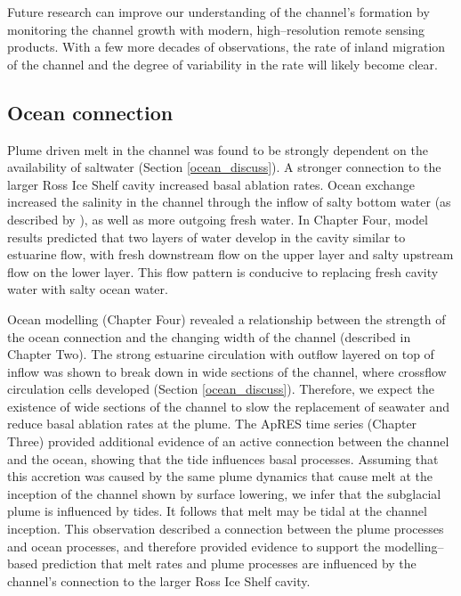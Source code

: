 Future research can improve our understanding of the channel's formation by monitoring the channel growth with modern, high--resolution remote sensing products. With a few more decades of observations, the rate of inland migration of the channel and the degree of variability in the rate will likely become clear.

\subsection{Ocean connection}

Plume driven melt in the channel was found to be strongly dependent on the availability of saltwater (Section \ref{ocean_discuss}).   A stronger connection to the larger Ross Ice Shelf cavity increased basal ablation rates.  Ocean exchange increased the salinity in the channel through the  inflow of salty bottom water (as described by \cite{goldberg2019accurately}), as well as more outgoing fresh water. In Chapter Four, model results predicted that two layers of water develop in the cavity similar to estuarine flow, with fresh downstream flow on the upper layer and salty upstream flow on the lower layer. This flow pattern is conducive to replacing fresh cavity water with salty ocean water. 

Ocean modelling (Chapter Four) revealed a relationship between the strength of the ocean connection and the changing width of the channel (described in Chapter Two). The strong estuarine circulation with outflow layered on top of inflow was shown to break down in wide sections of the channel, where crossflow circulation cells developed (Section \ref{ocean_discuss}). Therefore, we expect the existence of wide sections of the channel to slow the replacement of seawater and reduce basal ablation rates at the plume.
The ApRES time series (Chapter Three) provided additional evidence of an active connection between the channel and the ocean, showing that the tide influences basal processes. Assuming that this accretion was caused by the same plume dynamics that cause melt at the inception of the channel shown by surface lowering, we infer that the subglacial plume is influenced by tides. It follows that melt may be tidal at the channel inception.
This observation described a connection between the plume processes and ocean processes, and therefore provided evidence to support the modelling--based prediction that melt rates and plume processes are influenced by the channel's connection to the larger Ross Ice Shelf cavity. 

